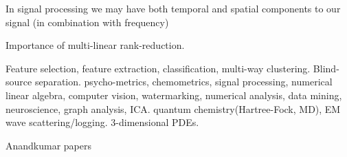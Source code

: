 In signal processing we may have both temporal and spatial components to our signal (in combination with frequency)

Importance of multi-linear rank-reduction.

Feature selection, feature extraction, classification, multi-way clustering.
Blind-source separation. 
psycho-metrics, chemometrics, signal processing, numerical linear algebra, computer vision, watermarking, numerical analysis, data mining, neuroscience, graph analysis, ICA.
quantum chemistry(Hartree-Fock, MD), EM wave scattering/logging. 3-dimensional PDEs. 

Anandkumar papers~\cite{Anandk}

